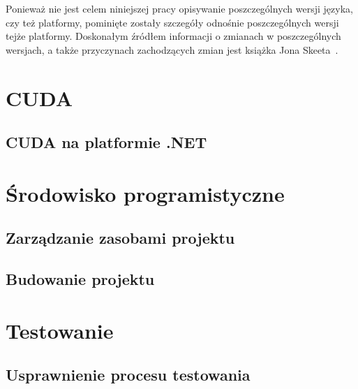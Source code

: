 Ponieważ nie jest celem niniejszej pracy opisywanie poszczególnych wersji języka, czy też platformy, pominięte zostały szczegóły odnośnie poszczególnych wersji tejże platformy. Doskonałym źródłem informacji o zmianach w poszczególnych wersjach, a także przyczynach zachodzących zmian jest książka Jona Skeeta~\cite{cSharp:inDepthS}.

\section{CUDA}

\subsection{CUDA na platformie .NET}

\section{Środowisko programistyczne}

\subsection{Zarządzanie zasobami projektu}

\subsection{Budowanie projektu}

\section{Testowanie}

\subsection{Usprawnienie procesu testowania}
